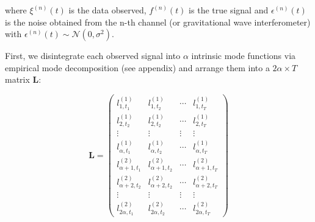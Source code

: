 \documentclass[onecolumn, groupedaddress, 10pt]{revtex4-1}
\begin{document}

where $\xi^{(n)}(t)$ is the data observed, $f^{(n)}(t)$ is the true signal and $\epsilon^{(n)}(t)$ is the noise obtained from the n-th channel (or gravitational wave interferometer) with $\epsilon^{(n)}(t) \sim \mathcal{N}(0,\sigma^2)$.

First, we disintegrate each observed signal into $\alpha$ intrinsic mode functions via empirical mode decomposition (see appendix) and arrange them into a $2 \alpha \times T$ matrix $\mathbf{L}$:

\begin{equation}
\mathbf{L} = \left( \begin{array}{cccc}
l_{1,t_1}^{(1)} & l_{1,t_2}^{(1)} & \cdots & l_{1,t_T}^{(1)} \\
l_{2,t_2}^{(1)} & l_{2,t_2}^{(1)} & \cdots & l_{2,t_T}^{(1)} \\
\vdots & \vdots & \vdots & \vdots \\
l_{\alpha,t_1}^{(1)} & l_{\alpha ,t_2}^{(1)} & \cdots & l_{\alpha,t_T}^{(1)} \\
l_{\alpha+1,t_1}^{(2)} & l_{\alpha+1,t_2}^{(2)} & \cdots & l_{\alpha+1,t_T}^{(2)} \\
l_{\alpha+2,t_2}^{(2)} & l_{\alpha+2,t_2}^{(2)} & \cdots & l_{\alpha+2,t_T}^{(2)} \\
\vdots & \vdots & \vdots & \vdots \\
l_{2\alpha,t_1}^{(2)} & l_{2\alpha,t_2}^{(2)} & \cdots & l_{2\alpha,t_T}^{(2)}
\end{array} \right)
\end{equation}
\end{document}
